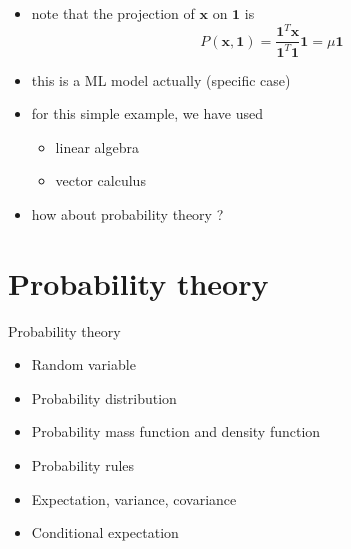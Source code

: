 \documentclass{scrartcl}
\def\tightlist{}
\newcommand{\vv}[1]{\boldsymbol{#1}}
\begin{document}
\begin{frame}{}
\protect\hypertarget{section-8}{}

\begin{itemize}
\item
  note that the projection of \(\vv{x}\) on \(\vv{1}\) is
  \[P(\vv{x}, \vv{1}) = \frac{\vv{1}^T\vv{x}}{\vv{1}^T\vv{1}} \vv{1} = \mu \vv{1}\]
\item
  this is a ML model actually (specific case)
\item
  for this simple example, we have used

  \begin{itemize}
  \tightlist
  \item
    linear algebra
  \item
    vector calculus
  \end{itemize}
\item
  how about probability theory ?
\end{itemize}

\end{frame}

\hypertarget{probability-theory}{%
\section{Probability theory}\label{probability-theory}}

\begin{frame}{Probability theory}
\protect\hypertarget{probability-theory-1}{}

\begin{itemize}
\tightlist
\item
  Random variable \bigskip
\item
  Probability distribution \bigskip
\item
  Probability mass function and density function \bigskip
\item
  Probability rules \bigskip
\item
  Expectation, variance, covariance \bigskip
\item
  Conditional expectation
\end{itemize}

\end{frame}
\end{document}

